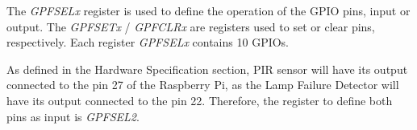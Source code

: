 The \textit{GPFSELx} register is used to define the operation of the GPIO pins, input or output. The \textit{GPFSETx} / \textit{GPFCLRx} are registers used to set or clear pins, respectively. Each register \textit{GPFSELx} contains 10 GPIOs.

As defined in the Hardware Specification section, PIR sensor will have its output connected to the pin 27 of the Raspberry Pi, as the Lamp Failure Detector will have its output connected to the pin 22. Therefore, the register to define both pins as input is \textit{GPFSEL2}.
